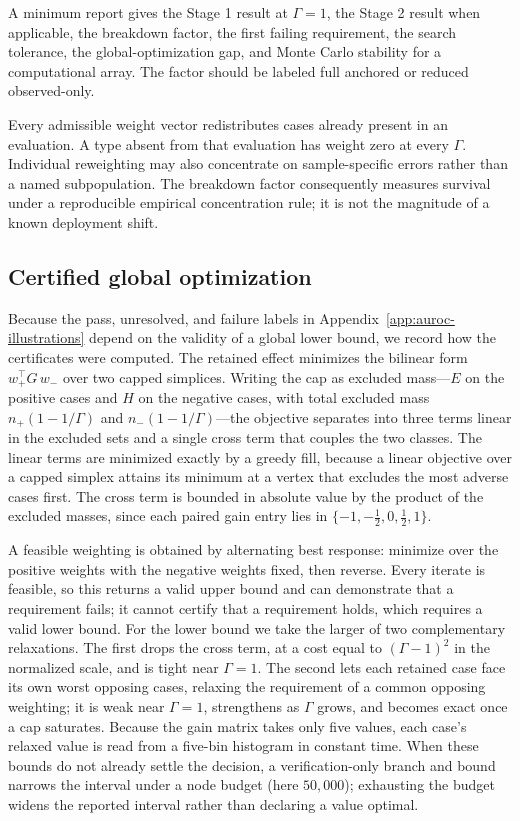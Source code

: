 \documentclass[11pt]{article}
\theoremstyle{remark}
\begin{document}
A minimum report gives the Stage 1 result at $\Gamma=1$, the Stage 2 result
when applicable, the breakdown factor, the first failing requirement, the
search tolerance, the global-optimization gap, and Monte Carlo stability for a
computational array. The factor should be labeled full anchored or reduced
observed-only.

Every admissible weight vector redistributes cases already present in an
evaluation. A type absent from that evaluation has weight zero at every
$\Gamma$. Individual reweighting may also concentrate on sample-specific
errors rather than a named subpopulation. The breakdown factor consequently
measures survival under a reproducible empirical concentration rule; it is not
the magnitude of a known deployment shift.

\subsection{Certified global optimization}
\label{app:auroc-certification}

Because the pass, unresolved, and failure labels in
Appendix~\ref{app:auroc-illustrations} depend on the validity of a global lower
bound, we record how the certificates were computed. The retained effect
minimizes the bilinear form $w_+^\top G\,w_-$ over two capped simplices. Writing
the cap as excluded mass---$E$ on the positive cases and $H$ on the negative
cases, with total excluded mass $n_+(1-1/\Gamma)$ and $n_-(1-1/\Gamma)$---the
objective separates into three terms linear in the excluded sets and a single
cross term that couples the two classes. The linear terms are minimized exactly
by a greedy fill, because a linear objective over a capped simplex attains its
minimum at a vertex that excludes the most adverse cases first. The cross term
is bounded in absolute value by the product of the excluded masses, since each
paired gain entry lies in $\{-1,-\tfrac12,0,\tfrac12,1\}$.

A feasible weighting is obtained by alternating best response: minimize over the
positive weights with the negative weights fixed, then reverse. Every iterate is
feasible, so this returns a valid upper bound and can demonstrate that a
requirement fails; it cannot certify that a requirement holds, which requires a
valid lower bound. For the lower bound we take the larger of two complementary
relaxations. The first drops the cross term, at a cost equal to $(\Gamma-1)^2$ in
the normalized scale, and is tight near $\Gamma=1$. The second lets each
retained case face its own worst opposing cases, relaxing the requirement of a
common opposing weighting; it is weak near $\Gamma=1$, strengthens as $\Gamma$
grows, and becomes exact once a cap saturates. Because the gain matrix takes
only five values, each case's relaxed value is read from a five-bin histogram in
constant time. When these bounds do not already settle the decision, a
verification-only branch and bound narrows the interval under a node budget
(here $50{,}000$); exhausting the budget widens the reported interval rather than
declaring a value optimal.
\end{document}
